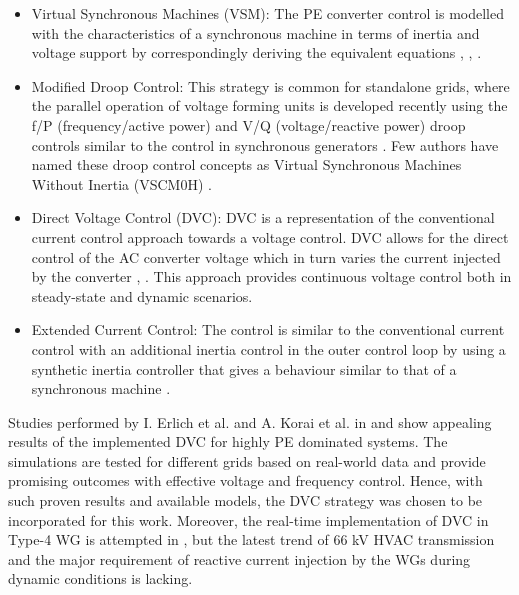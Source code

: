 \begin{itemize}
    \item Virtual Synchronous Machines (VSM): The \gls{PE} converter control is modelled with the characteristics of a synchronous machine in terms of inertia and voltage support by correspondingly deriving the equivalent equations \cite{markovic2018lqr}, \cite{duckwitz_operating_behavior}, \cite{lu_virtual_2019}.
    
    \item Modified Droop Control:
    This strategy is common for standalone grids, where the parallel operation of voltage forming units is developed recently using the f/P (frequency/active power) and V/Q (voltage/reactive power) droop controls similar to the control in synchronous generators \cite{bouzid2016simulation}. Few authors have named these droop control concepts as Virtual Synchronous Machines Without Inertia (VSCM0H) \cite{yu2016use}.
    
    \item Direct Voltage Control (\gls{DVC}):
    \gls{DVC} is a representation of the conventional current control approach towards a voltage control. \gls{DVC} allows for the direct control of the \gls{AC} converter voltage which in turn varies the current injected by the converter  \cite{korai_dynamic_2019}, \cite{erlich_new_2017}. This approach provides continuous voltage control both in steady-state and dynamic scenarios. %
    
    \item Extended Current Control:
    The control is similar to the conventional current control with an additional inertia control in the outer control loop by using a synthetic inertia controller that gives a behaviour similar to that of a synchronous machine \cite{duckwitz_derivation_2019} \cite{liu2017control}. 
\end{itemize}

Studies performed by I. Erlich et al. and A. Korai et al. in \cite{erlich_new_2017} and \cite{korai_dynamic_2019} show appealing results of the implemented \gls{DVC} for highly \gls{PE} dominated systems. The simulations are tested for different grids based on real-world data and provide promising outcomes with effective voltage and frequency control. Hence, with such proven results and available models, the \gls{DVC} strategy was chosen to be incorporated for this work. Moreover, the real-time implementation of \gls{DVC} in Type-4 \gls{WG} is attempted in \cite{sethi_real-time_nodate-new}, but the latest trend of 66 kV \gls{HVAC} transmission and the major requirement of reactive current injection by the \gls{WG}s during dynamic conditions is lacking.

